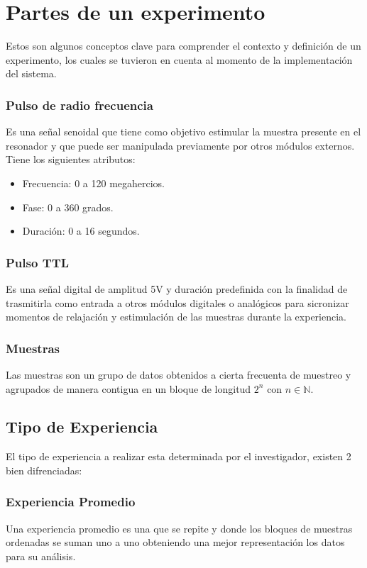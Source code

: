 \section{Partes de un experimento}

Estos son algunos conceptos clave para comprender el contexto y definici\'on de un
experimento, los cuales se tuvieron en cuenta al momento de la implementaci\'on 
del sistema.

\subsubsection{Pulso de radio frecuencia}
Es una se\~nal senoidal que tiene como objetivo
estimular la muestra presente en el resonador
y que puede ser manipulada previamente
por otros m\'odulos externos. Tiene los siguientes atributos:
    \begin{itemize}
        \item Frecuencia: 0 a 120 megahercios.
        \item Fase: 0 a 360 grados.
        \item Duraci\'on: 0 a 16 segundos.
    \end{itemize}

\subsubsection{Pulso TTL}
Es una se\~nal digital de amplitud 5V y duraci\'on predefinida con la finalidad de trasmitirla como entrada a otros m\'odulos digitales o anal\'ogicos para sicronizar momentos de relajaci\'on y estimulaci\'on de las muestras durante la experiencia.

\subsubsection{Muestras}
Las muestras son un grupo de datos obtenidos a cierta frecuenta de muestreo y agrupados de manera contigua 
en un bloque de longitud $2^{n}$ con $n \in \mathbb{N}$. 

\subsection{Tipo de Experiencia}
El tipo de experiencia a realizar esta determinada por el investigador, existen 2 bien difrenciadas:

\subsubsection{Experiencia Promedio}
Una experiencia promedio es una que se repite y donde los bloques de muestras ordenadas se suman uno a uno obteniendo
una mejor representaci\'on los datos para su an\'alisis.

